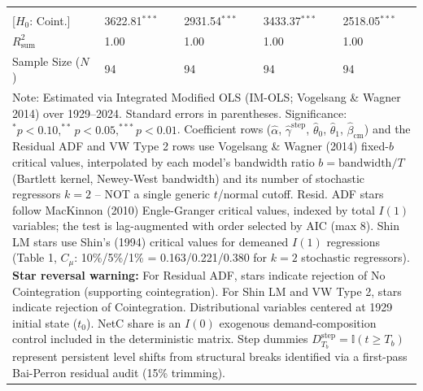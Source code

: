 \begin{table}[H]
\begin{tabular}{p{3.8cm}p{1.35cm}p{1.35cm}p{1.35cm}p{1.35cm}}
\makecell[l]{VW Type 2 ($S_{\text{Type 2}}$) \\ {\scriptsize [$H_0$: Coint.]}} & 3622.81$^{***}$ & 2931.54$^{***}$ & 3433.37$^{***}$ & 2518.05$^{***}$  \\
\midrule
$R^2_{\text{sum}}$ & 1.00 & 1.00 & 1.00 & 1.00  \\
Sample Size ($N$) & 94 & 94 & 94 & 94  \\
\bottomrule
\multicolumn{5}{p{13.2cm}}{\footnotesize Note: Estimated via Integrated Modified OLS (IM-OLS; Vogelsang \& Wagner 2014) over 1929--2024. Standard errors in parentheses. Significance: $^*p<0.10, ^{**}p<0.05, ^{***}p<0.01$. Coefficient rows ($\hat{\alpha}$, $\hat{\gamma}^{\text{step}}$, $\hat{\theta}_0$, $\hat{\theta}_1$, $\hat{\beta}_{\text{cm}}$) and the Residual ADF and VW Type 2 rows use Vogelsang \& Wagner (2014) fixed-$b$ critical values, interpolated by each model's bandwidth ratio $b=\text{bandwidth}/T$ (Bartlett kernel, Newey-West bandwidth) and its number of stochastic regressors $k=2$ -- NOT a single generic $t$/normal cutoff. Resid. ADF stars follow MacKinnon (2010) Engle-Granger critical values, indexed by total $I(1)$ variables; the test is lag-augmented with order selected by AIC (max 8). Shin LM stars use Shin's (1994) critical values for demeaned $I(1)$ regressions (Table 1, $C_\mu$: 10\%/5\%/1\% = 0.163/0.221/0.380 for $k=2$ stochastic regressors). \textbf{Star reversal warning:} For Residual ADF, stars indicate rejection of No Cointegration (supporting cointegration). For Shin LM and VW Type 2, stars indicate rejection of Cointegration. Distributional variables centered at 1929 initial state ($t_0$). NetC share is an $I(0)$ exogenous demand-composition control included in the deterministic matrix. Step dummies $D^{\text{step}}_{T_b} = \mathbb{I}(t \ge T_b)$ represent persistent level shifts from structural breaks identified via a first-pass Bai-Perron residual audit (15\% trimming).}
\end{tabular}
\end{table}
